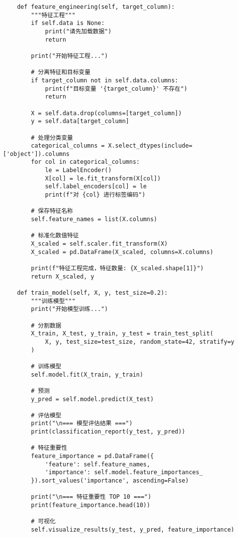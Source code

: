 \begin{codebox}[title=数据处理管道实现]
\begin{verbatim}
    def feature_engineering(self, target_column):
        """特征工程"""
        if self.data is None:
            print("请先加载数据")
            return
        
        print("开始特征工程...")
        
        # 分离特征和目标变量
        if target_column not in self.data.columns:
            print(f"目标变量 '{target_column}' 不存在")
            return
        
        X = self.data.drop(columns=[target_column])
        y = self.data[target_column]
        
        # 处理分类变量
        categorical_columns = X.select_dtypes(include=['object']).columns
        for col in categorical_columns:
            le = LabelEncoder()
            X[col] = le.fit_transform(X[col])
            self.label_encoders[col] = le
            print(f"对 {col} 进行标签编码")
        
        # 保存特征名称
        self.feature_names = list(X.columns)
        
        # 标准化数值特征
        X_scaled = self.scaler.fit_transform(X)
        X_scaled = pd.DataFrame(X_scaled, columns=X.columns)
        
        print(f"特征工程完成，特征数量: {X_scaled.shape[1]}")
        return X_scaled, y
    
    def train_model(self, X, y, test_size=0.2):
        """训练模型"""
        print("开始模型训练...")
        
        # 分割数据
        X_train, X_test, y_train, y_test = train_test_split(
            X, y, test_size=test_size, random_state=42, stratify=y
        )
        
        # 训练模型
        self.model.fit(X_train, y_train)
        
        # 预测
        y_pred = self.model.predict(X_test)
        
        # 评估模型
        print("\n=== 模型评估结果 ===")
        print(classification_report(y_test, y_pred))
        
        # 特征重要性
        feature_importance = pd.DataFrame({
            'feature': self.feature_names,
            'importance': self.model.feature_importances_
        }).sort_values('importance', ascending=False)
        
        print("\n=== 特征重要性 TOP 10 ===")
        print(feature_importance.head(10))
        
        # 可视化
        self.visualize_results(y_test, y_pred, feature_importance)
        

\end{verbatim}
\end{codebox}
